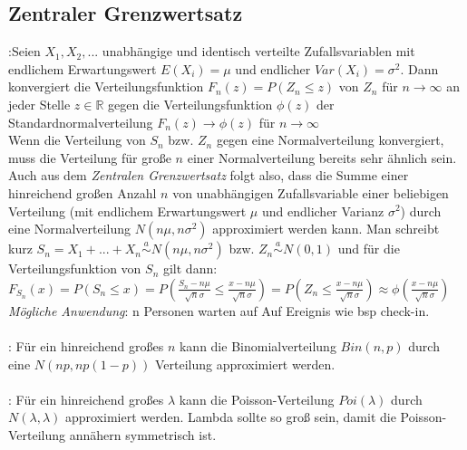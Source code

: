 \subsection{Zentraler Grenzwertsatz}
:Seien $X_1, X_2, ...$ unabhängige und identisch verteilte Zufallsvariablen mit endlichem Erwartungswert $E(X_i) = \mu$ und endlicher $Var(X_i) = \sigma^2$. Dann konvergiert die Verteilungsfunktion $F_n(z) = P(Z_n \le z)$ von $Z_n$ für $n \rightarrow \infty$ an jeder Stelle $z \in \mathds{R}$ gegen die Verteilungsfunktion $\phi(z)$ der Standardnormalverteilung $F_n(z) \rightarrow \phi(z)$ für $n \rightarrow \infty$\\
Wenn die Verteilung von $S_n$ bzw. $Z_n$ gegen eine Normalverteilung konvergiert, muss die Verteilung für große $n$ einer Normalverteilung bereits sehr ähnlich sein. Auch aus dem \emph{Zentralen Grenzwertsatz} folgt also, dass die Summe einer hinreichend großen Anzahl $n$ von unabhängigen Zufallsvariable einer beliebigen Verteilung (mit endlichem Erwartungswert $\mu$ und endlicher Varianz $\sigma^2$) durch eine Normalverteilung $N(n\mu, n\sigma^2)$ approximiert werden kann. Man schreibt kurz $S_n = X_1 + ... + X_n \overset{a}{\sim} N(n\mu, n\sigma^2)$ bzw. $Z_n \overset{a}{\sim} N(0, 1)$ und für die Verteilungsfunktion von $S_n$ gilt dann: $F_{S_n}(x) = P(S_n \le x) = P(\frac{S_n - n\mu}{\sqrt{n}\sigma} \le \frac{x - n\mu}{\sqrt{n}\sigma}) = P(Z_n \le \frac{x - n\mu}{\sqrt{n}\sigma}) \approx \phi(\frac{x - n\mu}{\sqrt{n}\sigma})$
\emph{Mögliche Anwendung}: n Personen warten auf Auf Ereignis wie bsp check-in.\\\\
: Für ein hinreichend großes $n$ kann die Binomialverteilung $Bin(n, p)$ durch eine $N(np, np(1-p))$ Verteilung approximiert werden.\\\\
: Für ein hinreichend großes $\lambda$ kann die Poisson-Verteilung $Poi(\lambda)$ durch $N(\lambda, \lambda)$ approximiert werden. Lambda sollte so groß sein, damit die Poisson-Verteilung annähern symmetrisch ist.\\\\

